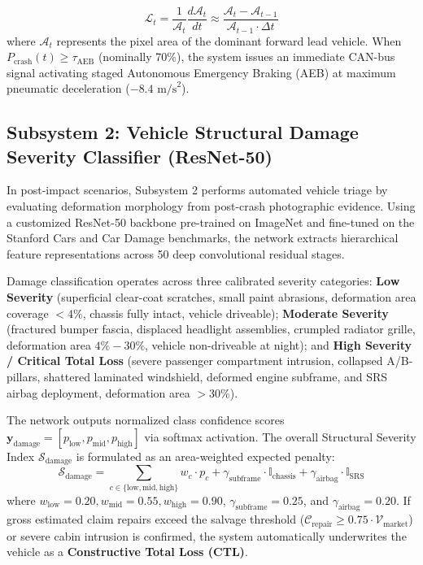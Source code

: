\documentclass[journal,compsoc]{IEEEtran}
\begin{document}
\begin{equation}
\mathcal{L}_t = \frac{1}{\mathcal{A}_t} \frac{d\mathcal{A}_t}{dt} \approx \frac{\mathcal{A}_t - \mathcal{A}_{t-1}}{\mathcal{A}_{t-1} \cdot \Delta t}
\end{equation}
where $\mathcal{A}_t$ represents the pixel area of the dominant forward lead vehicle. When $P_{\text{crash}}(t) \ge \tau_{\text{AEB}}$ (nominally 70\%), the system issues an immediate CAN-bus signal activating staged Autonomous Emergency Braking (AEB) at maximum pneumatic deceleration ($-8.4\text{ m/s}^2$).

\subsection{Subsystem 2: Vehicle Structural Damage Severity Classifier (ResNet-50)}
In post-impact scenarios, Subsystem 2 performs automated vehicle triage by evaluating deformation morphology from post-crash photographic evidence. Using a customized ResNet-50 backbone pre-trained on ImageNet and fine-tuned on the Stanford Cars and Car Damage benchmarks, the network extracts hierarchical feature representations across 50 deep convolutional residual stages.

Damage classification operates across three calibrated severity categories: \textbf{Low Severity} (superficial clear-coat scratches, small paint abrasions, deformation area coverage $< 4\%$, chassis fully intact, vehicle driveable); \textbf{Moderate Severity} (fractured bumper fascia, displaced headlight assemblies, crumpled radiator grille, deformation area $4\% - 30\%$, vehicle non-driveable at night); and \textbf{High Severity / Critical Total Loss} (severe passenger compartment intrusion, collapsed A/B-pillars, shattered laminated windshield, deformed engine subframe, and SRS airbag deployment, deformation area $> 30\%$).

The network outputs normalized class confidence scores $\mathbf{y}_{\text{damage}} = [p_{\text{low}}, p_{\text{mid}}, p_{\text{high}}]$ via softmax activation. The overall Structural Severity Index $\mathcal{S}_{\text{damage}}$ is formulated as an area-weighted expected penalty:
\begin{equation}
\mathcal{S}_{\text{damage}} = \sum_{c \in \{\text{low}, \text{mid}, \text{high}\}} w_c \cdot p_c + \gamma_{\text{subframe}} \cdot \mathbb{I}_{\text{chassis}} + \gamma_{\text{airbag}} \cdot \mathbb{I}_{\text{SRS}}
\end{equation}
where $w_{\text{low}}=0.20, w_{\text{mid}}=0.55, w_{\text{high}}=0.90$, $\gamma_{\text{subframe}}=0.25$, and $\gamma_{\text{airbag}}=0.20$. If gross estimated claim repairs exceed the salvage threshold ($\mathcal{C}_{\text{repair}} \ge 0.75 \cdot \mathcal{V}_{\text{market}}$) or severe cabin intrusion is confirmed, the system automatically underwrites the vehicle as a \textbf{Constructive Total Loss (CTL)}.
\end{document}
